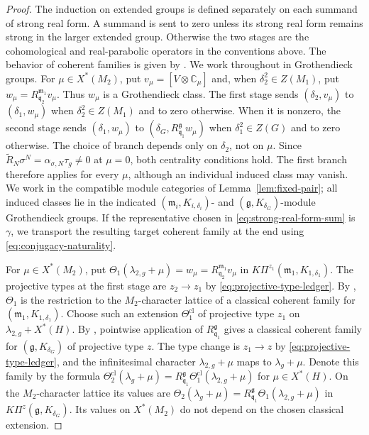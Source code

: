 \documentclass[10pt]{amsart}
\numberwithin{equation}{section}
\theoremstyle{plain}
\theoremstyle{definition}
\theoremstyle{remark}
\newcommand{\CC}{\mathbb C}
\newcommand{\fg}{\mathfrak g}
\newcommand{\fm}{\mathfrak m}
\newcommand{\fq}{\mathfrak q}
\begin{document}
\begin{proof}
The induction on extended groups is defined separately on each 
summand of strong real form. A summand is sent to zero unless its strong
real form remains strong in the larger extended group. Otherwise the two
stages are the cohomological and real-parabolic operators in the
conventions above. The behavior of coherent families is given by
\cite[Proposition~2.10.4 and Proposition~2.8.4]{AIMV26}.
We work throughout in Grothendieck groups. For $\mu\in X^*(M_2)$, put
$v_\mu=[V\otimes\CC_\mu]$ and, when $\delta_2^2\in Z(M_1)$, put
$w_\mu=R_{\fq_2}^{\fm_1}v_\mu$. Thus $w_\mu$ is a Grothendieck class. The first stage sends
$(\delta_2,v_\mu)$ to $(\delta_1,w_\mu)$ when
$\delta_2^2\in Z(M_1)$ and to zero otherwise. When it is nonzero, the
second stage sends $(\delta_1,w_\mu)$ to
$(\delta_G,R_{\fq_1}^{\fg}w_\mu)$ when $\delta_1^2\in Z(G)$ and to zero
otherwise.
The choice of branch depends only on $\delta_2$, not on $\mu$. Since
$\widetilde R_N\sigma^N=\alpha_{\sigma,N}\tau_g\neq0$ at $\mu=0$, both
centrality conditions hold. The first branch therefore applies for every
$\mu$, although an individual induced class may vanish. We work in the
compatible module categories of Lemma~\ref{lem:fixed-pair}; all induced
classes lie in the indicated
$(\mathfrak m_i,K_{i,\delta_i})$- and
$(\mathfrak g,K_{\delta_G})$-module Grothendieck groups. If the
representative chosen in \eqref{eq:strong-real-form-sum} is $\gamma$, we
transport the resulting target coherent family at the end using
\eqref{eq:conjugacy-naturality}.

For $\mu\in X^*(M_2)$, put
$\Theta_1(\lambda_{2,g}+\mu)=w_\mu=R_{\fq_2}^{\fm_1}v_\mu$ in
$K\Pi^{z_1}(\mathfrak m_1,K_{1,\delta_1})$.
The projective types at the first stage are $z_2\to z_1$ by
\eqref{eq:projective-type-ledger}. By \cite[Proposition~2.10.4]{AIMV26},
$\Theta_1$ is the restriction to the $M_2$-character lattice of
a classical coherent family for $(\mathfrak m_1,K_{1,\delta_1})$. Choose
such an extension $\Theta_1^{\mathrm{cl}}$ of projective type $z_1$ on
$\lambda_{2,g}+X^*(H)$. By \cite[Proposition~2.8.4]{AIMV26}, pointwise
application of $R_{\fq_1}^{\fg}$ gives a classical coherent family for
$(\mathfrak g,K_{\delta_G})$ of projective type $z$. The type change is
$z_1\to z$ by \eqref{eq:projective-type-ledger}, and the infinitesimal
character $\lambda_{2,g}+\mu$ maps to $\lambda_g+\mu$. Denote this family by
the formula
$\Theta_2^{\mathrm{cl}}(\lambda_g+\mu)=R_{\fq_1}^{\fg}
\Theta_1^{\mathrm{cl}}(\lambda_{2,g}+\mu)$ for $\mu\in X^*(H)$.
On the $M_2$-character lattice its values are
$\Theta_2(\lambda_g+\mu)=R_{\fq_1}^{\fg}
\Theta_1(\lambda_{2,g}+\mu)$ in
$K\Pi^z(\mathfrak g,K_{\delta_G})$.
Its values on $X^*(M_2)$ do not depend on the chosen classical extension.


\end{proof}
\end{document}
